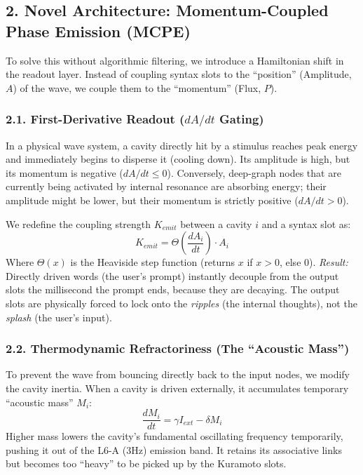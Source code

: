 \documentclass[
  11pt,
  a4paper,
]{article}
\begin{document}
\subsection{2. Novel Architecture: Momentum-Coupled Phase Emission
(MCPE)}\label{novel-architecture-momentum-coupled-phase-emission-mcpe}

To solve this without algorithmic filtering, we introduce a Hamiltonian
shift in the readout layer. Instead of coupling syntax slots to the
``position'' (Amplitude, \(A\)) of the wave, we couple them to the
``momentum'' (Flux, \(P\)).

\subsubsection{\texorpdfstring{2.1. First-Derivative Readout (\(dA/dt\)
Gating)}{2.1. First-Derivative Readout (dA/dt Gating)}}\label{first-derivative-readout-dadt-gating}

In a physical wave system, a cavity directly hit by a stimulus reaches
peak energy and immediately begins to disperse it (cooling down). Its
amplitude is high, but its momentum is negative (\(dA/dt \le 0\)).
Conversely, deep-graph nodes that are currently being activated by
internal resonance are absorbing energy; their amplitude might be lower,
but their momentum is strictly positive (\(dA/dt > 0\)).

We redefine the coupling strength \(K_{emit}\) between a cavity \(i\)
and a syntax slot as:
\[ K_{emit} = \Theta\left(\frac{dA_i}{dt}\right) \cdot A_i \] Where
\(\Theta(x)\) is the Heaviside step function (returns \(x\) if \(x>0\),
else \(0\)). \emph{Result:} Directly driven words (the user's prompt)
instantly decouple from the output slots the millisecond the prompt
ends, because they are decaying. The output slots are physically forced
to lock onto the \emph{ripples} (the internal thoughts), not the
\emph{splash} (the user's input).

\subsubsection{2.2. Thermodynamic Refractoriness (The ``Acoustic
Mass'')}\label{thermodynamic-refractoriness-the-acoustic-mass}

To prevent the wave from bouncing directly back to the input nodes, we
modify the cavity inertia. When a cavity is driven externally, it
accumulates temporary ``acoustic mass'' \(M_i\):
\[ \frac{dM_i}{dt} = \gamma I_{ext} - \delta M_i \] Higher mass lowers
the cavity's fundamental oscillating frequency temporarily, pushing it
out of the L6-A (3Hz) emission band. It retains its associative links
but becomes too ``heavy'' to be picked up by the Kuramoto slots.
\end{document}

